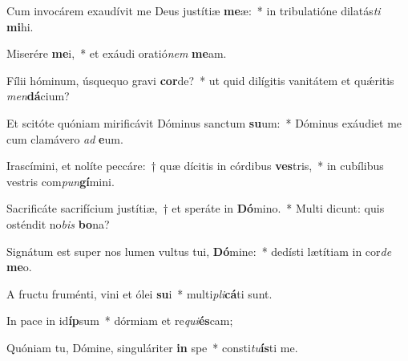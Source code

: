 \item Cum invocárem exaudívit me Deus justítiæ \textbf{me}æ:~* in tribulatióne dilatás\textit{ti} \textbf{mi}hi.
\item Miserére \textbf{me}i,~* et exáudi oratió\textit{nem} \textbf{me}am.
\item Fílii hóminum, úsquequo gravi \textbf{cor}de?~* ut quid dilígitis vanitátem et quǽritis \textit{men}\textbf{dá}cium?
\item Et scitóte quóniam mirificávit Dóminus sanctum \textbf{su}um:~* Dóminus exáudiet me cum clamávero \textit{ad} \textbf{e}um.
\item Irascímini, et nolíte peccáre:~† quæ dícitis in córdibus \textbf{ves}tris,~* in cubílibus vestris com\textit{pun}\textbf{gí}mini.
\item Sacrificáte sacrifícium justítiæ,~† et speráte in \textbf{Dó}mino.~* Multi dicunt: quis osténdit no\textit{bis} \textbf{bo}na?
\item Signátum est super nos lumen vultus tui, \textbf{Dó}mine:~* dedísti lætítiam in cor\textit{de} \textbf{me}o.
\item A fructu fruménti, vini et ólei \textbf{su}i~* multi\textit{pli}\textbf{cá}ti sunt.
\item In pace in id\textbf{íp}sum~* dórmiam et re\textit{qui}\textbf{és}cam;
\item Quóniam tu, Dómine, singuláriter \textbf{in} spe~* consti\textit{tu}\textbf{ís}ti me.
